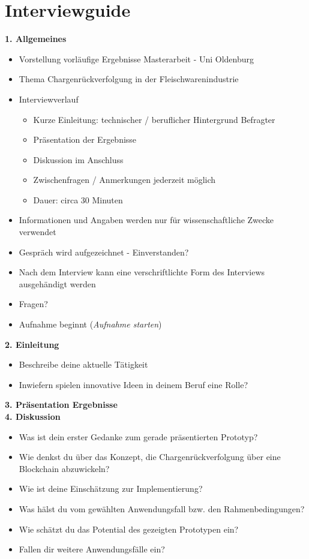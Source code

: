 \section{Interviewguide}\label{sec:interview-guide}
\footnotesize
\textbf{1. Allgemeines}
\begin{itemize}
  \item Vorstellung vorläufige Ergebnisse Masterarbeit - Uni Oldenburg
  \item Thema \glqq Chargenrückverfolgung in der Fleischwarenindustrie\grqq
  \item Interviewverlauf
  \begin{itemize}[nosep]
    \item Kurze Einleitung: technischer / beruflicher Hintergrund Befragter
    \item Präsentation der Ergebnisse
    \item Diskussion im Anschluss
    \item Zwischenfragen / Anmerkungen jederzeit möglich
    \item Dauer: circa 30 Minuten
  \end{itemize}
  \item Informationen und Angaben werden nur für wissenschaftliche Zwecke verwendet
  \item Gespräch wird aufgezeichnet - Einverstanden?
  \item Nach dem Interview kann eine verschriftlichte Form des Interviews ausgehändigt werden
  \item Fragen?
  \item Aufnahme beginnt (\textit{Aufnahme starten})
\end{itemize}

\noindent
\textbf{2. Einleitung}
\begin{itemize}
  \item Beschreibe deine aktuelle Tätigkeit
  \item Inwiefern spielen innovative Ideen in deinem Beruf eine Rolle?
\end{itemize}

\noindent
\textbf{3. Präsentation Ergebnisse}\\
\noindent
\textbf{4. Diskussion}
\begin{itemize}
  \item Was ist dein erster Gedanke zum gerade präsentierten Prototyp?
  \item Wie denkst du über das Konzept, die Chargenrückverfolgung über eine Blockchain abzuwickeln?
  \item Wie ist deine Einschätzung zur Implementierung?
  \item Was hälst du vom gewählten Anwendungsfall bzw. den Rahmenbedingungen?
  \item Wie schätzt du das Potential des gezeigten Prototypen ein?
  \item Fallen dir weitere Anwendungsfälle ein?
\end{itemize}

